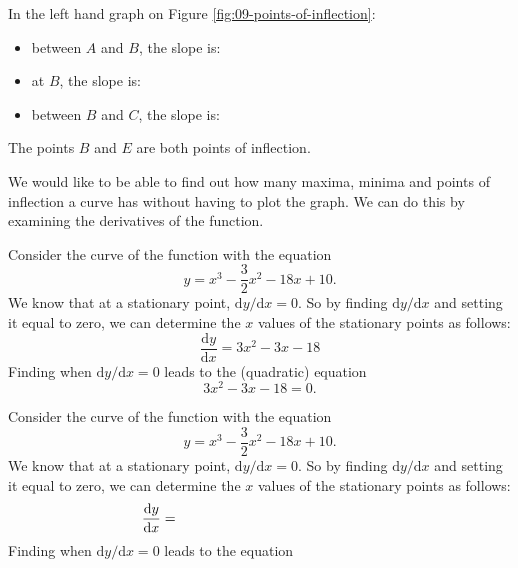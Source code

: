\documentclass[
  english,
  11pt,
  oneside]{book}
\providecommand{\tightlist}{%
  \setlength{\itemsep}{0pt}\setlength{\parskip}{0pt}}
\newcommand{\slide}{}
\theoremstyle{definition}
\theoremstyle{definition}
\theoremstyle{definition}
\theoremstyle{definition}
\theoremstyle{remark}
\begin{document}
\begin{slidesonly}

In the left hand graph on Figure \ref{fig:09-points-of-inflection}:

\begin{itemize}
\tightlist
\item
  between \(A\) and \(B\), the slope is:
\item
  at \(B\), the slope is:
\item
  between \(B\) and \(C\), the slope is:
\end{itemize}

\end{slidesonly}

The points \(B\) and \(E\) are both points of inflection.

\slide

We would like to be able to find out how many maxima, minima and points of inflection a curve has without having to plot the graph. We can do this by examining the derivatives of the function.

\begin{notslides}

Consider the curve of the function with the equation
\[y = x^3-\frac 32x^2-18x+10.\]
We know that at a stationary point, \(\mathrm{d}y/\mathrm{d} x=0\). So by finding \(\mathrm{d}y/\mathrm{d} x\) and setting it equal to zero, we can determine the \(x\) values of the stationary points as follows:
\begin{equation}
\frac{\mathrm{d} y}{\mathrm{d} x} = 3x^2-3x-18
\label{eq:3-1}
\end{equation}
Finding when \(\mathrm{d}y/\mathrm{d} x = 0\) leads to the (quadratic) equation
\begin{equation}
3x^2-3x-18=0.
\label{eq:3-2}
\end{equation}

\end{notslides}

\begin{slidesonly}

Consider the curve of the function with the equation
\[y = x^3-\frac 32x^2-18x+10.\]
We know that at a stationary point, \(\mathrm{d}y/\mathrm{d} x=0\). So by finding \(\mathrm{d}y/\mathrm{d} x\) and setting it equal to zero, we can determine the \(x\) values of the stationary points as follows:
\begin{equation}
\frac{\mathrm{d} y}{\mathrm{d} x} =\hbox to 5cm{}
\label{eq:3-1}
\end{equation}
Finding when \(\mathrm{d}y/\mathrm{d} x = 0\) leads to the equation
\begin{equation}
\label{eq:3-2}
\end{equation}

\end{slidesonly}
\end{document}

